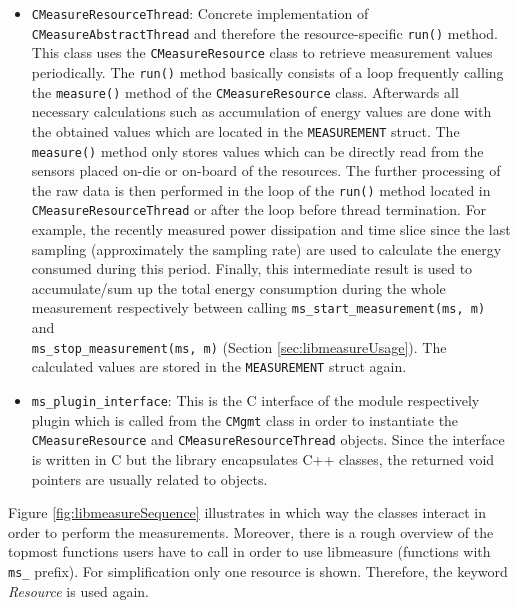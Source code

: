 \begin{description}
\begin{itemize}
		\item \texttt{CMeasureResourceThread}: Concrete implementation of\\ 
		\texttt{CMeasureAbstractThread} and therefore the resource-specific \texttt{run()} method. This class uses the \texttt{CMeasureResource} class to retrieve measurement values periodically. The \texttt{run()} method basically consists of a loop frequently calling the \texttt{measure()} method of the \texttt{CMeasureResource} class. Afterwards all necessary calculations such as accumulation of energy values are done with the obtained values which are located in the \texttt{MEASUREMENT} struct. The \texttt{measure()} method only stores values which can be directly read from the sensors placed on-die or on-board of the resources. The further processing of the raw data is then performed in the loop of the \texttt{run()} method located in \texttt{CMeasureResourceThread} or after the loop before thread termination. For example, the recently measured power dissipation and time slice since the last sampling (approximately the sampling rate) are used to calculate the energy consumed during this period. Finally, this intermediate result is used to accumulate/sum up the total energy consumption during the whole measurement respectively between calling \texttt{ms\_start\_measurement(ms, m)} and \\\texttt{ms\_stop\_measurement(ms, m)} (Section \ref{sec:libmeasureUsage}). The calculated values are stored in the \texttt{MEASUREMENT} struct again. 
			
		\item \texttt{ms\_plugin\_interface}: This is the C interface of the module respectively plugin which is called from the \texttt{CMgmt} class in order to instantiate the \texttt{CMeasureResource} and \texttt{CMeasureResourceThread} objects. Since the interface is written in C but the library encapsulates C++ classes, the returned void pointers are usually related to objects.
	\end{itemize}
\end{description}

Figure \ref{fig:libmeasureSequence} illustrates in which way the classes interact in order to perform the measurements. Moreover, there is a rough overview of the topmost functions users have to call in order to use libmeasure (functions with \texttt{ms\_} prefix). For simplification only one resource is shown. Therefore, the keyword \textit{Resource} is used again.\\

